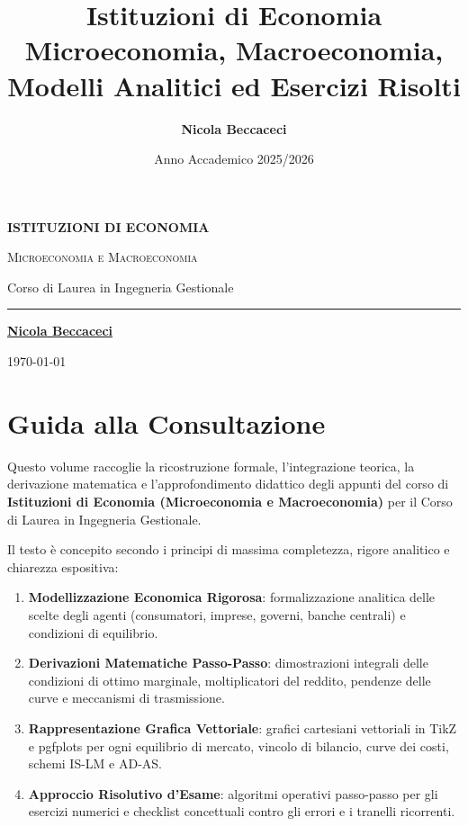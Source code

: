 \documentclass[11pt,a4paper,twoside,openright]{book}
\title{\Huge\textbf{\textsf{Istituzioni di Economia}}\\[0.5em]
\Large\textsf{Microeconomia, Macroeconomia, Modelli Analitici ed Esercizi Risolti}}
\author{\textbf{\textsf{Nicola Beccaceci}}}
\date{\textsf{Anno Accademico 2025/2026}}
\begin{document}
\frontmatter
\begin{titlepage}
    \centering
    \vspace*{2cm}
    {\Huge\bfseries\color{navyblue} ISTITUZIONI DI ECONOMIA\par}
    \vspace{0.8cm}
    {\Large\scshape Microeconomia e Macroeconomia\par}
    \vspace{0.5cm}
    {\large\textsf{Corso di Laurea in Ingegneria Gestionale}\par}
    \vfill
    \rule{0.6\textwidth}{1.2pt}\par
    \vspace{1cm}
    {\large\textbf{\underline{Nicola Beccaceci}}\par}
    \vspace{0.5cm}
    {\small \today\par}
    \vspace*{2cm}
\end{titlepage}

\tableofcontents
\cleardoublepage

\chapter*{Guida alla Consultazione}
Questo volume raccoglie la ricostruzione formale, l'integrazione teorica, la derivazione matematica e l'approfondimento didattico degli appunti del corso di \textbf{Istituzioni di Economia (Microeconomia e Macroeconomia)} per il Corso di Laurea in Ingegneria Gestionale.

Il testo è concepito secondo i principi di massima completezza, rigore analitico e chiarezza espositiva:
\begin{enumerate}
    \item \textbf{Modellizzazione Economica Rigorosa}: formalizzazione analitica delle scelte degli agenti (consumatori, imprese, governi, banche centrali) e condizioni di equilibrio.
    \item \textbf{Derivazioni Matematiche Passo-Passo}: dimostrazioni integrali delle condizioni di ottimo marginale, moltiplicatori del reddito, pendenze delle curve e meccanismi di trasmissione.
    \item \textbf{Rappresentazione Grafica Vettoriale}: grafici cartesiani vettoriali in TikZ e pgfplots per ogni equilibrio di mercato, vincolo di bilancio, curve dei costi, schemi IS-LM e AD-AS.
    \item \textbf{Approccio Risolutivo d'Esame}: algoritmi operativi passo-passo per gli esercizi numerici e checklist concettuali contro gli errori e i tranelli ricorrenti.
\end{enumerate}
\end{document}
